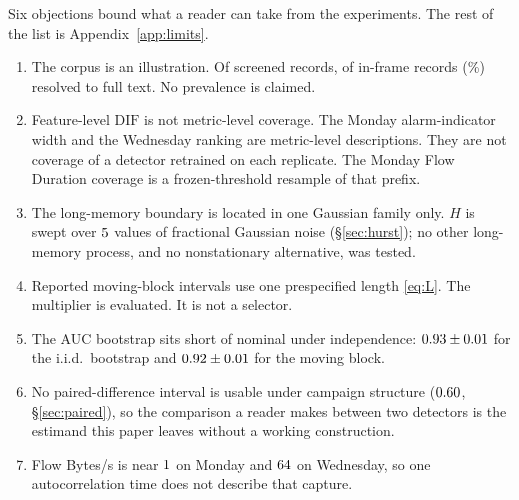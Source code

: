 \documentclass[a4paper,fleqn]{cas-dc}
\newcommand{\DIF}{\mathrm{DIF}}
\begin{document}
Six objections bound what a reader can take from the experiments. The rest of the list is Appendix~\ref{app:limits}.
\begin{enumerate}
\item The corpus is an illustration. Of \Npool{} screened records, \NinframeRes{} of \Ninframe{} in-frame records (\ResRate\%) resolved to full text. No prevalence is claimed.
\item Feature-level $\DIF$ is not metric-level coverage. The Monday alarm-indicator width and the Wednesday ranking are metric-level descriptions. They are not coverage of a detector retrained on each replicate. The Monday Flow Duration coverage is a frozen-threshold resample of that prefix.
\item The long-memory boundary is located in one Gaussian family only. $H$ is swept over
$5$ values of fractional Gaussian noise (\S\ref{sec:hurst}); no other long-memory process,
and no nonstationary alternative, was tested.
\item Reported moving-block intervals use one prespecified length \eqref{eq:L}. The multiplier is evaluated. It is not a selector.
\item The AUC bootstrap sits short of nominal under independence: $0.93\pm0.01$ for the i.i.d.\ bootstrap and $0.92\pm0.01$ for the moving block.
\item No paired-difference interval is usable under campaign structure ($0.60$,
\S\ref{sec:paired}), so the comparison a reader makes between two detectors is the estimand this
paper leaves without a working construction.
\item Flow Bytes/s is near $1$ on Monday and $64$ on Wednesday, so one autocorrelation time does not describe that capture.
\end{enumerate}


\FloatBarrier
\end{document}
